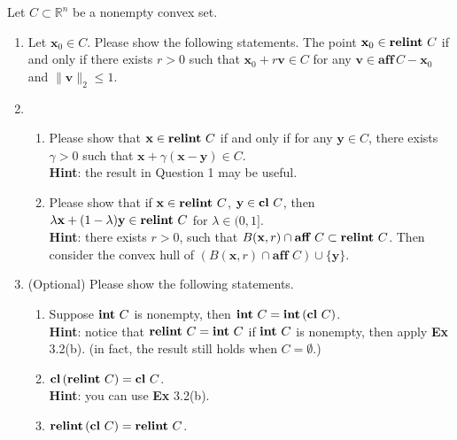 \documentclass[11pt,letter,notitlepage]{article}
\DeclareMathOperator*{\relint}{\bf relint\,}
\DeclareMathOperator*{\intp}{\bf int\,}
\DeclareMathOperator*{\cl}{\bf cl\,}
\DeclareMathOperator*{\bd}{\bf bd\,}
\begin{document}
\newpage

\begin{exercise}
    Let $C\subset\mathbb{R}^n$ be a nonempty convex set.
    \begin{enumerate}
      \item Let $\mathbf{x}_0\in C$. Please show the following statements.
        The point $\mathbf{x}_0\in \relint C$ if and only if there exists $r>0$ such that $\mathbf{x}_0 +r\mathbf{v}\in C$ for any $\mathbf{v}\in\textbf{aff}\,C-\mathbf{x}_0 $ and $\|\mathbf{v}\|_2\le 1$.

      \item
        \begin{enumerate}
  
                \item Please show that $\mathbf{x} \in \relint C$ if and only if for any $\mathbf{y}\in C$, there exists $\gamma>0$ such that $\mathbf{x}+\gamma(\mathbf{x}-\mathbf{y}) \in C$.\\
                \textbf{Hint}: the result in Question 1 may be useful.

                \item Please show that if $\mathbf{x} \in \relint C$, $\mathbf{y} \in \cl C$, then  $\lambda \mathbf{x}+(1-\lambda) \mathbf{y} \in \relint C$ for $\lambda \in(0,1]$.\\
                 \textbf{Hint}: there exists $r>0$, such that $B(\mathbf{x}, r)\cap \textbf{aff }C\subset \relint C$. Then consider the convex hull of $(B(\mathbf{x}, r)\cap \textbf{aff }C)\cup \{\mathbf{y}\}$.

        \end{enumerate}
        \item (Optional)
      Please show the following statements.
          \begin{enumerate}
            \item Suppose $\intp C$ is nonempty, then $\intp C=\intp(\cl C)$. \\
            \textbf{Hint}: notice that $\relint C=\intp C$ if $\intp C$ is nonempty, then apply \textbf{Ex} 3.2(b).
            (in fact, the result still holds when $C=\emptyset$.)
            \item $\cl (\relint C)=\cl C$.\\
            \textbf{Hint}: you can use \textbf{Ex} 3.2(b).
            \item $\relint (\cl C)=\relint C$.
% 


        \end{enumerate}
    \end{enumerate}

\end{exercise}
\end{document}
